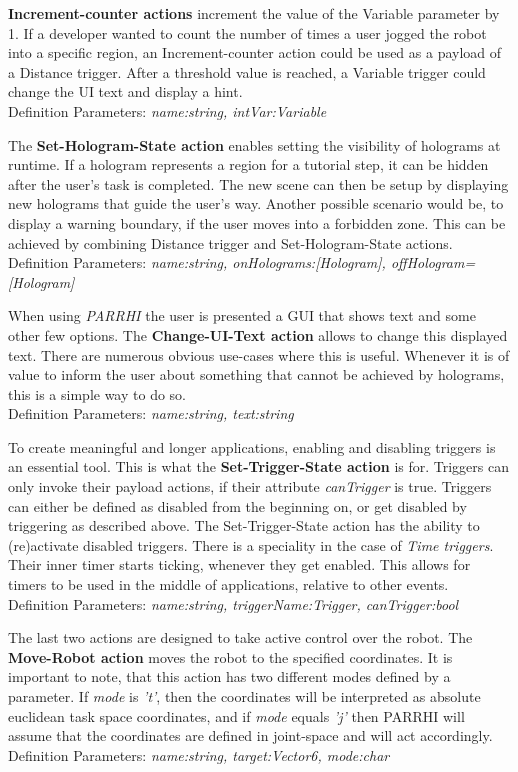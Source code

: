 \textbf{Increment-counter actions} increment the value of the Variable parameter by 1. If a developer wanted to count the number of times a user jogged the robot into a specific region, an Increment-counter action could be used as a payload of a Distance trigger. After a threshold value is reached, a Variable trigger could change the UI text and display a hint.\\Definition Parameters: \textit{name:string, intVar:Variable}

The \textbf{Set-Hologram-State action} enables setting the visibility of holograms at runtime. If a hologram represents a region for a tutorial step, it can be hidden after the user's task is completed. The new scene can then be setup by displaying new holograms that guide the user's way. Another possible scenario would be, to display a warning boundary, if the user moves into a forbidden zone. This can be achieved by combining Distance trigger and Set-Hologram-State actions.\\Definition Parameters: \textit{name:string, onHolograms:[Hologram], offHologram=[Hologram]}

When using \textit{PARRHI} the user is presented a GUI that shows text and some other few options. The \textbf{Change-UI-Text action} allows to change this displayed text. There are numerous obvious use-cases where this is useful. Whenever it is of value to inform the user about something that cannot be achieved by holograms, this is a simple way to do so.\\Definition Parameters: \textit{name:string, text:string}

To create meaningful and longer applications, enabling and disabling triggers is an essential tool. This is what the \textbf{Set-Trigger-State action} is for. Triggers can only invoke their payload actions, if their attribute \textit{canTrigger} is true. Triggers can either be defined as disabled from the beginning on, or get disabled by triggering as described above. The Set-Trigger-State action has the ability to (re)activate disabled triggers. There is a speciality in the case of \textit{Time triggers}. Their inner timer starts ticking, whenever they get enabled. This allows for timers to be used in the middle of applications, relative to other events.\\Definition Parameters: \textit{name:string, triggerName:Trigger, canTrigger:bool}

The last two actions are designed to take active control over the robot. The \textbf{Move-Robot action} moves the robot to the specified coordinates. It is important to note, that this action has two different modes defined by a  parameter. If \textit{mode} is \textit{'t'}, then the coordinates will be interpreted as absolute euclidean task space coordinates, and if \textit{mode} equals \textit{'j'} then PARRHI will assume that the coordinates are defined in joint-space and will act accordingly.\\Definition Parameters: \textit{name:string, target:Vector6, mode:char}

